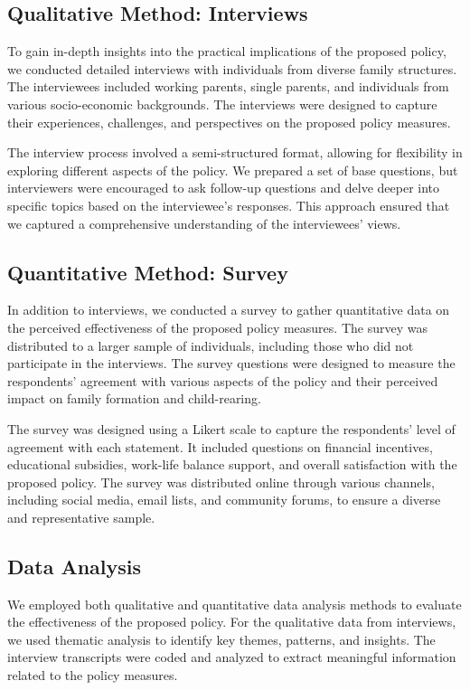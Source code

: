 \documentclass{article} %
\begin{document}
\subsection{Qualitative Method: Interviews}
To gain in-depth insights into the practical implications of the proposed policy, we conducted detailed interviews with individuals from diverse family structures. The interviewees included working parents, single parents, and individuals from various socio-economic backgrounds. The interviews were designed to capture their experiences, challenges, and perspectives on the proposed policy measures.

The interview process involved a semi-structured format, allowing for flexibility in exploring different aspects of the policy. We prepared a set of base questions, but interviewers were encouraged to ask follow-up questions and delve deeper into specific topics based on the interviewee's responses. This approach ensured that we captured a comprehensive understanding of the interviewees' views.

\subsection{Quantitative Method: Survey}
In addition to interviews, we conducted a survey to gather quantitative data on the perceived effectiveness of the proposed policy measures. The survey was distributed to a larger sample of individuals, including those who did not participate in the interviews. The survey questions were designed to measure the respondents' agreement with various aspects of the policy and their perceived impact on family formation and child-rearing.

The survey was designed using a Likert scale to capture the respondents' level of agreement with each statement. It included questions on financial incentives, educational subsidies, work-life balance support, and overall satisfaction with the proposed policy. The survey was distributed online through various channels, including social media, email lists, and community forums, to ensure a diverse and representative sample.

\subsection{Data Analysis}
We employed both qualitative and quantitative data analysis methods to evaluate the effectiveness of the proposed policy. For the qualitative data from interviews, we used thematic analysis to identify key themes, patterns, and insights. The interview transcripts were coded and analyzed to extract meaningful information related to the policy measures.
\end{document}
